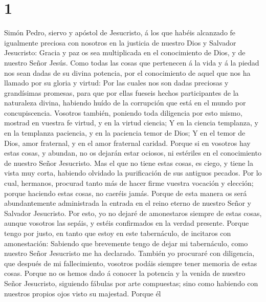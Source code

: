 \hypertarget{section}{%
\section{1}\label{section}}

 Simón Pedro, siervo y apóstol de Jesucristo, á los que
habéis alcanzado fe igualmente preciosa con nosotros en la justicia de
nuestro Dios y Salvador Jesucristo:  Gracia y paz os sea
multiplicada en el conocimiento de Dios, y de nuestro Señor Jesús.
 Como todas las cosas que pertenecen á la vida y á la
piedad nos sean dadas de su divina potencia, por el conocimiento de
aquel que nos ha llamado por su gloria y virtud:  Por las
cuales nos son dadas preciosas y grandísimas promesas, para que por
ellas fueseis hechos participantes de la naturaleza divina, habiendo
huído de la corrupción que está en el mundo por concupiscencia.
 Vosotros también, poniendo toda diligencia por esto
mismo, mostrad en vuestra fe virtud, y en la virtud ciencia;
 Y en la ciencia templanza, y en la templanza paciencia, y
en la paciencia temor de Dios;  Y en el temor de Dios,
amor fraternal, y en el amor fraternal caridad.  Porque si
en vosotros hay estas cosas, y abundan, no os dejarán estar ociosos, ni
estériles en el conocimiento de nuestro Señor Jesucristo. 
Mas el que no tiene estas cosas, es ciego, y tiene la vista muy corta,
habiendo olvidado la purificación de sus antiguos pecados.
 Por lo cual, hermanos, procurad tanto más de hacer firme
vuestra vocación y elección; porque haciendo estas cosas, no caeréis
jamás.  Porque de esta manera os será abundantemente
administrada la entrada en el reino eterno de nuestro Señor y Salvador
Jesucristo.  Por esto, yo no dejaré de amonestaros
siempre de estas cosas, aunque vosotros las sepáis, y estéis confirmados
en la verdad presente.  Porque tengo por justo, en tanto
que estoy en este tabernáculo, de incitaros con amonestación:
 Sabiendo que brevemente tengo de dejar mi tabernáculo,
como nuestro Señor Jesucristo me ha declarado.  También
yo procuraré con diligencia, que después de mi fallecimiento, vosotros
podáis siempre tener memoria de estas cosas.  Porque no
os hemos dado á conocer la potencia y la venida de nuestro Señor
Jesucristo, siguiendo fábulas por arte compuestas; sino como habiendo
con nuestros propios ojos visto su majestad.  Porque él
